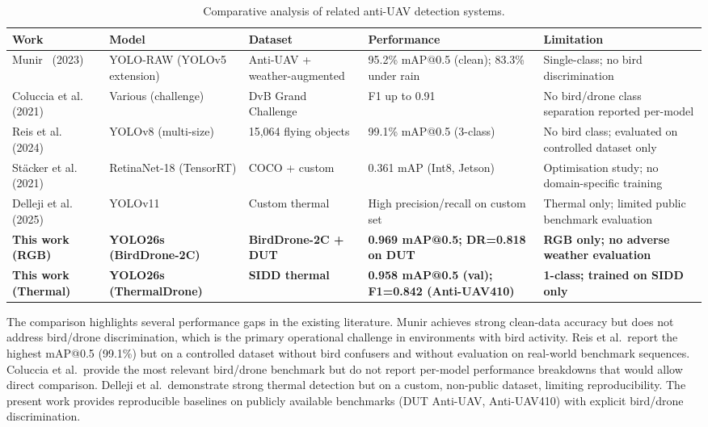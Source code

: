 \documentclass[12pt,a4paper]{report}
\begin{document}
\begin{table}[H]
\centering
\caption{Comparative analysis of related anti-UAV detection systems.}
\label{tab:lit_compare}
\small
\begin{tabular}{|p{3.0cm}|p{2.4cm}|p{2.4cm}|p{2.4cm}|p{2.4cm}|}
\hline
\textbf{Work} & \textbf{Model} & \textbf{Dataset} & \textbf{Performance} & \textbf{Limitation} \\
\hline
Munir~\cite{munir2023kfupm} (2023) & YOLO-RAW (YOLOv5 extension) & Anti-UAV + weather-augmented & 95.2\% mAP@0.5 (clean); 83.3\% under rain & Single-class; no bird discrimination \\
\hline
Coluccia et al.~\cite{coluccia2021sensors} (2021) & Various (challenge) & DvB Grand Challenge & F1 up to 0.91 & No bird/drone class separation reported per-model \\
\hline
Reis et al.~\cite{reis2024yolov8} (2024) & YOLOv8 (multi-size) & 15,064 flying objects & 99.1\% mAP@0.5 (3-class) & No bird class; evaluated on controlled dataset only \\
\hline
Stäcker et al.~\cite{stacker2021} (2021) & RetinaNet-18 (TensorRT) & COCO + custom & 0.361 mAP (Int8, Jetson) & Optimisation study; no domain-specific training \\
\hline
Delleji et al.~\cite{delleji2025thermal} (2025) & YOLOv11 & Custom thermal & High precision/recall on custom set & Thermal only; limited public benchmark evaluation \\
\hline
\textbf{This work (RGB)} & \textbf{YOLO26s (BirdDrone-2C)} & \textbf{BirdDrone-2C + DUT} & \textbf{0.969 mAP@0.5; DR=0.818 on DUT} & \textbf{RGB only; no adverse weather evaluation} \\
\hline
\textbf{This work (Thermal)} & \textbf{YOLO26s (ThermalDrone)} & \textbf{SIDD thermal} & \textbf{0.958 mAP@0.5 (val); F1=0.842 (Anti-UAV410)} & \textbf{1-class; trained on SIDD only} \\
\hline
\end{tabular}
\end{table}

The comparison highlights several performance gaps in the existing literature.
Munir achieves strong clean-data accuracy but does not address bird/drone
discrimination, which is the primary operational challenge in environments
with bird activity. Reis et al.\ report the highest mAP@0.5 (99.1\%) but
on a controlled dataset without bird confusers and without evaluation on
real-world benchmark sequences. Coluccia et al.\ provide the most relevant
bird/drone benchmark but do not report per-model performance breakdowns
that would allow direct comparison. Delleji et al.\ demonstrate strong
thermal detection but on a custom, non-public dataset, limiting reproducibility.
The present work provides reproducible baselines on publicly available
benchmarks (DUT Anti-UAV, Anti-UAV410) with explicit bird/drone discrimination.
\end{document}
